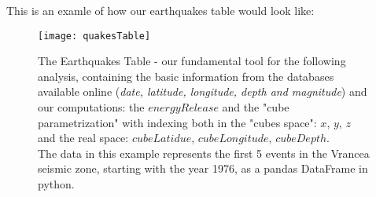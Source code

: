 \clearpage
This is an examle of how our earthquakes table would look like:
\begin{figure}[!h]

\centering
\texttt{[image: quakesTable]}
\caption{The Earthquakes Table - our fundamental tool for the following analysis, containing the basic information from the databases available online ({\it date, latitude, longitude, depth and magnitude}) and our computations: the $energyRelease$ and the "cube parametrization" with indexing both in the "cubes space": $x$, $y$, $z$ and the real space: $cubeLatidue$, $cubeLongitude$, $cubeDepth$.\\ The data in this example represents the first 5 events in the Vrancea seismic zone, starting with the year 1976, as a pandas DataFrame in python.}
\label{fig:quakesTable}

\end{figure}